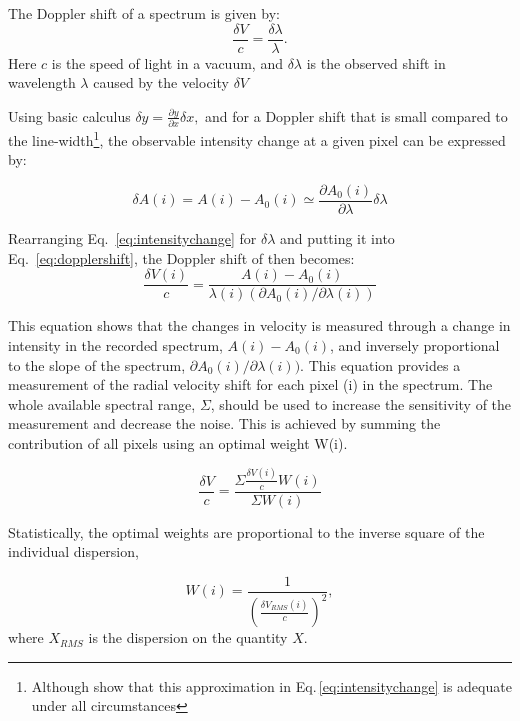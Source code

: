 The Doppler shift of a spectrum is given by:
\begin{equation}
\frac{\delta V}{c} = \frac{\delta \lambda}{\lambda}.
\label{eq:dopplershift}
\end{equation}
Here $c$ is the speed of light in a vacuum, and $\delta \lambda$ is the observed shift in wavelength $\lambda$ caused by the velocity $\delta V$

Using basic calculus \(\delta y = \frac{\partial y}{\partial x} \delta x,  \nonumber\) and for a Doppler shift that is small compared to the line-width\footnote{Although \citet{Connes1985} show that this approximation in Eq.\,\ref{eq:intensitychange} is adequate under all circumstances}, the observable intensity change at a given pixel can be expressed by:

\begin{equation}
\delta A(i) = A(i) - A_0(i) \simeq \frac{\partial A_0(i)}{\partial \lambda} \delta \lambda
\label{eq:intensitychange}
\end{equation}

Rearranging Eq.~\ref{eq:intensitychange} for \(\delta \lambda\) and putting it into Eq.~\ref{eq:dopplershift}, the Doppler shift of then becomes:
\begin{equation}
    \frac{\delta V(i)}{c} = \frac{A(i) - A_0(i) }{\lambda(i) (\partial A_0(i)/\partial \lambda(i))}
\end{equation}

This equation shows that the changes in velocity is measured through a change in intensity in the recorded spectrum, \(A(i)-A_0(i)\), and inversely proportional to the slope of the spectrum, \(\partial A_0(i)/\partial \lambda(i))\). 
This equation provides a measurement of the radial velocity shift for each pixel (i) in the spectrum. The whole available spectral range, $\Sigma$, should be used to increase the sensitivity of the measurement and decrease the noise. This is achieved by summing the contribution of all pixels using an optimal weight W(i).

\begin{equation}
\frac{\delta V}{c} = \frac{\Sigma{ \frac{\delta V(i)}{c}W(i)}}{\Sigma {W(i)}}
\end{equation}

Statistically, the optimal weights are proportional to the inverse square of the individual dispersion,


\begin{equation}
W(i) = \frac{1}{\left(\frac{\delta V_{RMS}(i)}{c}\right)^2},
\end{equation}
where $X_{RMS}$ is the dispersion on the quantity $X$.


